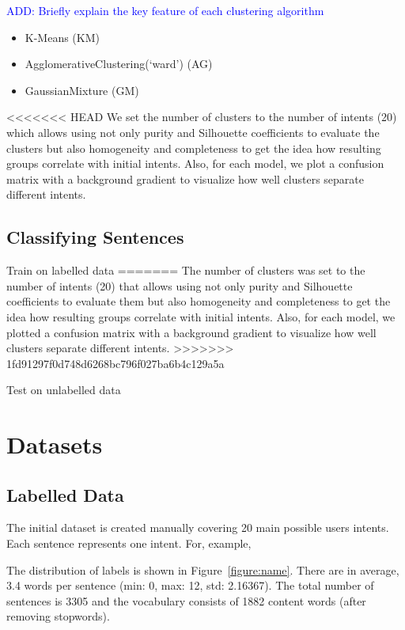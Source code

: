 \documentclass[11pt]{article}
\newcommand\add[1]{{\textcolor{blue}{ADD: #1}}}
\begin{document}
\add{Briefly explain the key feature of each clustering algorithm}


\begin{itemize}
\item K-Means (KM)
\item AgglomerativeClustering(‘ward’) (AG)
\item GaussianMixture (GM)
\end{itemize}

<<<<<<< HEAD
We set the number of clusters to the number of intents (20)
which allows using not only purity and Silhouette coefficients to
evaluate the clusters but also homogeneity and completeness to get the
idea how resulting groups correlate with initial intents. Also, for
each model, we plot a confusion matrix with a background gradient
to visualize how well clusters separate different intents.

\subsection{Classifying Sentences}

Train on labelled data
=======
The number of clusters was set to the number of intents (20) that allows using not only purity and Silhouette coefficients to evaluate them but also homogeneity and completeness to get the idea how resulting groups correlate with initial intents. Also, for each model, we plotted a confusion matrix with a background gradient to visualize how well clusters separate different intents.
>>>>>>> 1fd91297f0d748d6268bc796f027ba6b4c129a5a

Test on unlabelled data

\section{Datasets}

\subsection{Labelled Data}

The initial dataset is created manually covering 20 main possible users intents. Each sentence represents one intent. For, example,


The distribution of labels is shown in Figure~\ref{figure:name}. There
are in average, 3.4 words per sentence (min: 0, max: 12, std:
2.16367).  The total number of sentences is 3305 and the vocabulary
consists of 1882 content words (after removing stopwords).
\end{document}
